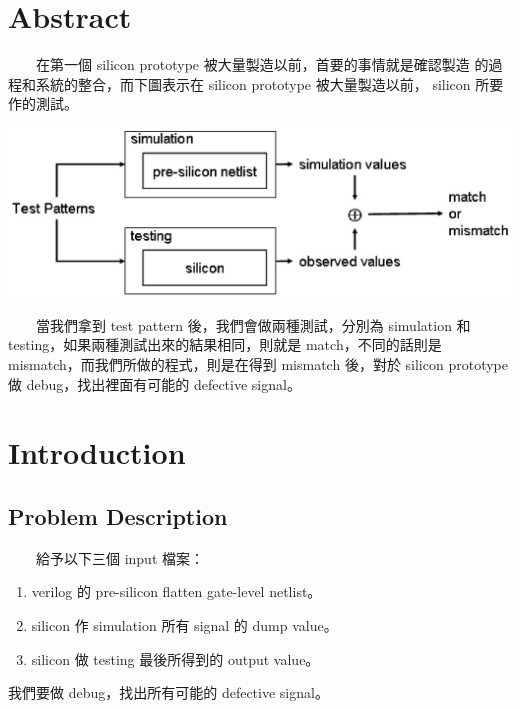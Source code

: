 \documentclass[12pt,a4paper]{article}
\begin{document}
\begin{CJK*}{UTF8}{song}

\CJKspace


\section{Abstract}

　　在第一個 silicon prototype 被大量製造以前，首要的事情就是確認製造%
的過程和系統的整合，而下圖表示在 silicon prototype 被大量製造以前，%
silicon 所要作的測試。

\begin{center}
\includegraphics[scale=0.6]{imgs/01.eps}
\end{center}

　　當我們拿到 test pattern 後，我們會做兩種測試，分別為 simulation %
和 testing，如果兩種測試出來的結果相同，則就是 match，不同的話則是%
 mismatch，而我們所做的程式，則是在得到 mismatch 後，對於 silicon %
prototype 做 debug，找出裡面有可能的 defective signal。

\section{Introduction}

\subsection{Problem Description}

　　給予以下三個 input 檔案：

\begin{enumerate}
\item verilog 的 pre-silicon flatten gate-level netlist。
\item silicon 作 simulation 所有 signal 的 dump value。
\item silicon 做 testing 最後所得到的 output value。
\end{enumerate}

我們要做 debug，找出所有可能的 defective signal。


\end{CJK*}
\end{document}
